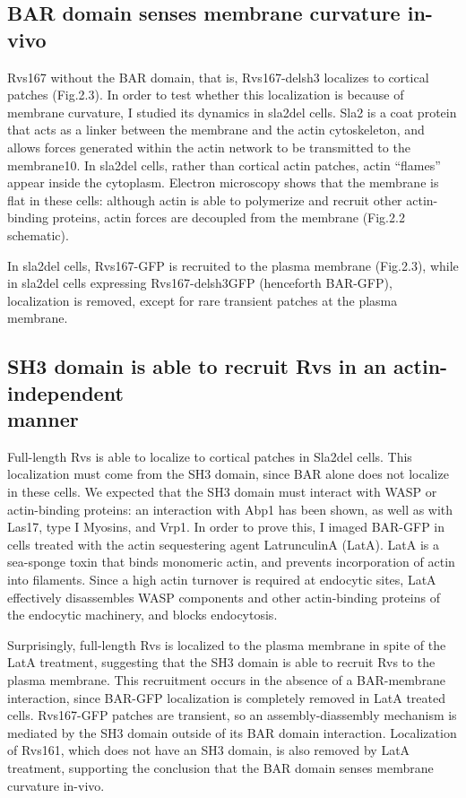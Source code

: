 	\subsection{BAR domain senses membrane curvature in-vivo}
	Rvs167 without the BAR domain, that is, Rvs167-delsh3 localizes to cortical patches (Fig.2.3). In order to test whether this localization is because of membrane curvature, I studied its dynamics in sla2del cells. Sla2 is a coat protein that acts as a linker between the membrane and the actin cytoskeleton, and allows forces generated within the actin network to be transmitted to the membrane10. In sla2del cells, rather than cortical actin patches, actin “flames” appear inside the cytoplasm. Electron microscopy shows that the membrane is flat in these cells: although actin is able to polymerize and recruit other actin-binding proteins, actin forces are decoupled from the membrane (Fig.2.2 schematic). 
	
	\vspace{5mm}
	In sla2del cells, Rvs167-GFP is recruited to the plasma membrane (Fig.2.3), while in sla2del cells expressing Rvs167-delsh3GFP (henceforth BAR-GFP), localization is removed, except for rare transient patches at the plasma membrane. 

	\subsection{SH3 domain is able to recruit Rvs in an
	actin-independent  	\\ manner}
	Full-length Rvs is able to localize to cortical patches in Sla2del cells. This localization must come from the SH3 domain, since BAR alone 	does not localize in these cells. We expected that the SH3 domain must interact with WASP or actin-binding proteins: an interaction with Abp1 has been shown, as well as with Las17, type I Myosins, and Vrp1. In order to prove this, I imaged BAR-GFP in cells treated with the actin sequestering agent LatrunculinA (LatA). LatA is a sea-sponge toxin that binds monomeric actin, and prevents incorporation of actin into filaments. Since a high actin turnover is required at endocytic sites, LatA effectively disassembles WASP components and other actin-binding proteins of the endocytic machinery, and blocks endocytosis. 

	\vspace{5mm}
	Surprisingly, full-length Rvs is localized to the plasma membrane in spite of the LatA treatment, suggesting that the SH3 domain is able to recruit Rvs to the plasma membrane. This recruitment occurs in the absence of a BAR-membrane interaction, since BAR-GFP localization is completely removed in LatA treated cells. Rvs167-GFP patches are transient, so an assembly-diassembly mechanism is mediated by the SH3 domain outside of its BAR domain interaction. Localization of Rvs161, which does not have an SH3 domain, is also removed by LatA treatment, supporting the conclusion that the BAR domain senses membrane curvature in-vivo. 

